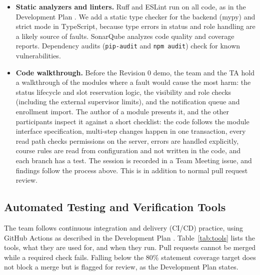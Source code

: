 \documentclass[12pt, titlepage]{article}
\begin{document}
  \begin{itemize}
    \item \textbf{Static analyzers and linters.} Ruff and ESLint run on all code,
    as in the Development Plan \citep{DevelopmentPlan}. We add a static type checker for the
    backend (mypy) and strict mode in TypeScript, because type errors in status and role handling are a
    likely source of faults. SonarQube analyzes code quality and coverage reports.
    Dependency audits (\texttt{pip-audit} and \texttt{npm audit}) check for known vulnerabilities.
    \item \textbf{Code walkthrough.} Before the Revision 0 demo, the team and the TA hold a walkthrough of the
    modules where a fault would cause the most harm: the status lifecycle and slot reservation logic,
    the visibility and role checks (including the external supervisor limits),
    and the notification queue and enrollment import.
    The author of a module presents it, and the other participants inspect it against a short checklist:
    the code follows the module interface specification, multi-step changes happen in one transaction,
    every read path checks permissions on the server, errors are handled explicitly,
    course rules are read from configuration and not written in the code, and each branch has a test.
    The session is recorded in a Team Meeting issue, and findings follow the process above.
    This is in addition to normal pull request review.
  \end{itemize}

  \subsection{Automated Testing and Verification Tools}
  \label{sec:tools}

  The team follows continuous integration and delivery (CI/CD) practice,
  using GitHub Actions as described in the Development Plan \citep{DevelopmentPlan}.
  Table~\ref{tab:tools} lists the tools, what they are used for, and when they run.
  Pull requests cannot be merged while a required check fails.
  Falling below the 80\% statement coverage target does not block a merge but is flagged for review,
  as the Development Plan states.
\end{document}
